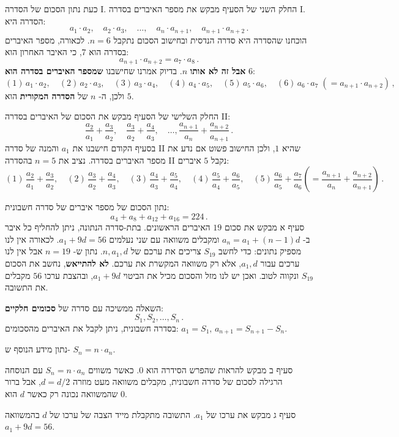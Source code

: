 \documentclass[12pt,a4paper]{article}
\begin{document}
כעת נתון הסכום של הסדרה I. החלק השני של הסעיף מבקש את מספר האיברים בסדרה I. הסדרה היא: 
\[
a_1\cdot a_2,\quad a_2\cdot a_3,\quad \ldots,\quad a_n\cdot a_{n+1},\quad a_{n+1} \cdot a_{n+2}\,.
\]
הוכחנו שהסדרה היא סדרה הנדסית ובחישוב הסכום נתקבל
$n=6$.
לכאורה, מספר האיברים בסדרה הוא
$7$,
כי האיבר האחרון הוא:
\[
a_{n+1} \cdot a_{n+2} = a_{7} \cdot a_{8}\,.
\]
\textbf{אבל זה לא אותו}
$n$.
בדיוק אמרנו שחישבנו
\textbf{שמספר האיברים בסדרה הוא}
$6$:
\[
(1)\, a_1\cdot a_2,\quad (2)\,a_2\cdot a_3,\quad(3)\, a_3\cdot a_4,\quad (4)\,a_4\cdot a_5,\quad (5)\,a_5\cdot a_6,\quad (6)\,a_6\cdot a_7 \;(= a_{n+1}\cdot a_{n+2})\,,
\]
ולכן, ה-%
$n$
של
\textbf{הסדרה המקורית}
הוא
$5$.

החלק השלישי של הסעיף מבקש את הסכום של האיברים בסדרה II:
\[
\frac{a_2}{a_1}+\frac{a_3}{a_2},\quad
\frac{a_3}{a_2}+\frac{a_4}{a_3},\quad
\ldots,
\frac{a_{n+1}}{a_n}+\frac{a_{n+2}}{a_{n+1}}\,.
\]
בסעיף הקודם חישבנו את
$a_1$
והמנה של סדרה II שהיא
$1$,
ולכן החישוב פשוט אם נדע את מספר האיברים בסדרה. נציב את
$n=5$
בהסדרה II נקבל
$5$
איברים:
\[
(1)\,\frac{a_2}{a_1}+\frac{a_3}{a_2},\quad
(2)\,\frac{a_3}{a_2}+\frac{a_4}{a_3},\quad
(3)\,\frac{a_4}{a_3}+\frac{a_5}{a_4},\quad
(4)\,\frac{a_5}{a_4}+\frac{a_6}{a_5},\quad
(5)\,\frac{a_6}{a_5}+\frac{a_7}{a_6} \left(= \frac{a_{n+1}}{a_n}+\frac{a_{n+2}}{a_{n+1}}\right)\,.
\]

\newpage

\textbf{}
נתון הסכום של מספר איברים של סדרה חשבונית:
\[
a_4+a_8+a_{12}+a_{16}=224\,.
\]
סעיף א מבקש את סכום 
$19$
האיברים הראשונים. בתת-סדרה הנתונה, ניתן להחליף כל איבר ב-%
$a_n=a_1+(n-1)d$
ומקבלים משוואה עם שני נעלמים
$a_1+9d=56$.
לכאורה אין לנו מספיק נתונים: כדי לחשב
$S_{19}$
צריכים את ערכם של
$n, a_1, d$.
נתון ש-%
$n=19$
אבל אין לנו ערכים עבור 
$a_1, d$,
אלא רק משוואה המקשרת את ערכם.
\textbf{לא להתייאש},
נחשב את הסכום
$S_{19}$
ונקווה לטוב. ואכן יש לנו מזל והסכום מכיל את הביטוי 
$a_1+9d$,
ובהצבת ערכו
$56$
מקבלים את התשובה.

השאלה ממשיכה עם סדרה של
\textbf{סכומים חלקיים}:
\[
S_1, S_2, \ldots, S_n\,.
\]
בסדרה חשבונית, ניתן לקבל את האיברים מהסכומים:
$a_1 = S_1,\,a_{n+1}=S_{n+1}-S_n$.

נתון מידע הנוסף ש-%
$S_n=n\cdot a_n$.

סעיף ב מבקש להראות שהפרש הסידרה הוא
$0$.
כאשר משווים 
$S_n=n\cdot a_n$
עם הנוסחה הרגילה לסכום של סדרה חשבונית, מקבלים משוואה מעט מוזרה
$d=d/2$,
אבל ברור שהמשוואה נכונה רק כאשר
$d$
הוא
$0$.

סעיף ג מבקש את ערכו של
$a_1$.
התשובה מתקבלת מייד הצבה של ערכו של
$d$
בהמשוואה
$a_1+9d=56$.
\end{document}
